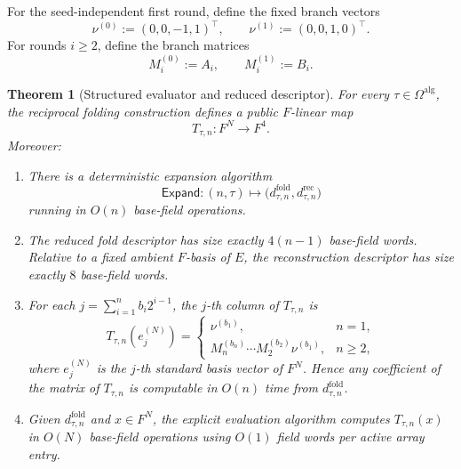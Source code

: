 \documentclass[11pt]{article}
\newtheorem{theorem}{Theorem}[section]
\begin{document}
For the seed-independent first round, define the fixed branch vectors
\[
\nu^{(0)}:=(0,0,-1,1)^\top,
\qquad
\nu^{(1)}:=(0,0,1,0)^\top.
\]
For rounds \(i\ge 2\), define the branch matrices
\[
M_i^{(0)}:=A_i,
\qquad
M_i^{(1)}:=B_i.
\]

\begin{theorem}[Structured evaluator and reduced descriptor]
\label{thm:descriptor}
For every \(\tau\in\Omega^{\mathrm{alg}}\), the reciprocal folding construction defines a public \(F\)-linear map
\[
T_{\tau,n}:F^N\to F^4.
\]
Moreover:
\begin{enumerate}[label=\arabic*.]
\item There is a deterministic expansion algorithm
   \[
   \mathsf{Expand}:(n,\tau)\longmapsto \big(d^{\mathrm{fold}}_{\tau,n},d^{\mathrm{rec}}_{\tau,n}\big)
   \]
   running in \(O(n)\) base-field operations.
\item The reduced fold descriptor has size exactly \(4(n-1)\) base-field words. Relative to a fixed ambient \(F\)-basis of \(E\), the reconstruction descriptor has size exactly \(8\) base-field words.
\item For each \(j=\sum_{i=1}^{n} b_i2^{i-1}\), the \(j\)-th column of \(T_{\tau,n}\) is
   \[
   T_{\tau,n}(e_j^{(N)})=
   \begin{cases}
   \nu^{(b_1)},& n=1,\\[0.5ex]
   M_n^{(b_n)}\cdots M_2^{(b_2)}\nu^{(b_1)},& n\ge 2,
   \end{cases}
   \]
   where \(e_j^{(N)}\) is the \(j\)-th standard basis vector of \(F^N\). Hence any coefficient of the matrix of \(T_{\tau,n}\) is computable in \(O(n)\) time from \(d^{\mathrm{fold}}_{\tau,n}\).
\item Given \(d^{\mathrm{fold}}_{\tau,n}\) and \(x\in F^N\), the explicit evaluation algorithm computes \(T_{\tau,n}(x)\) in \(O(N)\) base-field operations using \(O(1)\) field words per active array entry.
\end{enumerate}
\end{theorem}
\end{document}
